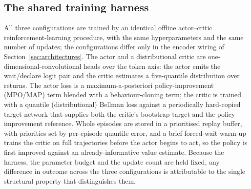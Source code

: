 \subsection{The shared training harness}
All three configurations are trained by an identical offline actor--critic reinforcement-learning procedure, with the same hyperparameters and the same number of updates; the configurations differ only in the encoder wiring of Section~\ref{sec:architectures}. The actor and a distributional critic are one-dimensional-convolutional heads over the token axis: the actor emits the wait/declare logit pair and the critic estimates a five-quantile distribution over returns. The actor loss is a maximum-a-posteriori policy-improvement (MPO/MAP) term blended with a behaviour-cloning term; the critic is trained with a quantile (distributional) Bellman loss against a periodically hard-copied target network that supplies both the critic's bootstrap target and the policy-improvement reference. Whole episodes are stored in a prioritised replay buffer, with priorities set by per-episode quantile error, and a brief forced-wait warm-up trains the critic on full trajectories before the actor begins to act, so the policy is first improved against an already-informative value estimate. Because the harness, the parameter budget and the update count are held fixed, any difference in outcome across the three configurations is attributable to the single structural property that distinguishes them.
